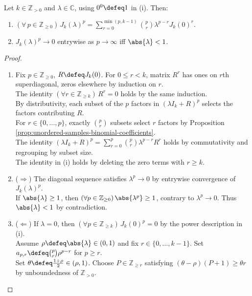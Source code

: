 \begin{proposition} \label{prop:powers-of-jordan-block} \\
Let $k\in\mathbb{Z}_{>0}$ and $\lambda\in\mathbb{C}$, using $0^0\defeq1$ in (i). Then:
\begin{enumerate}[label=(\roman*)]
\setlength{\itemsep}{0pt}
\item $(\forall\,p\in\mathbb{Z}_{\geq0})\,J_k(\lambda)^p=\sum\limits_{r=0}^{\min(p,k-1)}\binom{p}{r}\lambda^{p-r}J_k(0)^r$.
\item $J_k(\lambda)^p\to0$ entrywise as $p\to\infty$ iff $\abs{\lambda}<1$.
\end{enumerate}
\begin{proof}
\begin{enumerate}[label=(\roman*)]
\setlength{\itemsep}{0pt}
\item[$(i)$] Fix $p\in\mathbb{Z}_{\geq0}$, $R\defeq J_k(0)$. For $0\leq r<k$, matrix $R^r$ has ones on $r$th superdiagonal, zeros elsewhere by induction on $r$.\\
The identity $(\forall r\in\mathbb{Z}_{\geq k})\,R^r=0$ holds by the same induction.\\
By distributivity, each subset of the $p$ factors in $(\lambda I_k+R)^p$ selects the factors contributing $R$.\\
For $r\in\{0,\ldots,p\}$, exactly $\binom{p}{r}$ subsets select $r$ factors by Proposition \ref{prop:unordered-samples-binomial-coefficients}.\\
The identity $(\lambda I_k+R)^p=\sum\limits_{r=0}^{p}\binom{p}{r}\lambda^{p-r}R^r$ holds by commutativity and regrouping by subset size.\\
The identity in (i) holds by deleting the zero terms with $r\geq k$.
\item[$(ii)$] ($\Rightarrow$) The diagonal sequence satisfies $\lambda^p\to0$ by entrywise convergence of $J_k(\lambda)^p$.\\
If $\abs{\lambda}\geq1$, then $(\forall p\in\mathbb{Z}_{\geq0})\,\abs{\lambda^p}\geq1$, contrary to $\lambda^p\to0$. Thus $\abs{\lambda}<1$ by contradiction.
\item[$(ii)$] ($\Leftarrow$) If $\lambda=0$, then $(\forall p\in\mathbb{Z}_{\geq k})\,J_k(0)^p=0$ by the power description in (i).\\
Assume $\rho\defeq\abs{\lambda}\in(0,1)$ and fix $r\in\{0,\ldots,k-1\}$. Set $a_{p,r}\defeq\binom{p}{r}\rho^{p-r}$ for $p\geq r$.\\
Set $\theta\defeq\frac{1+\rho}{2}\in(\rho,1)$. Choose $P\in\mathbb{Z}_{\geq r}$ satisfying $(\theta-\rho)(P+1)\geq\theta r$ by unboundedness of $\mathbb{Z}_{>0}$.\\

\end{enumerate}
\end{proof}
\end{proposition}
